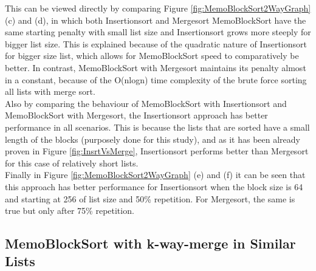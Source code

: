 \documentclass[a4paper,12pt]{article}
\begin{document}
This can be viewed directly by comparing Figure \ref{fig:MemoBlockSort2WayGraph} (c) and (d), in which both Insertionsort and Mergesort MemoBlockSort have the same starting penalty with small list size and Insertionsort grows more steeply for bigger list size. This is explained because of the quadratic nature of Insertionsort for bigger size list, which allows for MemoBlockSort speed to comparatively be better. In contrast, MemoBlockSort with Mergesort maintains its penalty almost in a constant, because of the O(nlogn) time complexity of the brute force sorting all lists with merge sort.\\

Also by comparing the behaviour of MemoBlockSort with Insertionsort and MemoBlockSort with Mergesort, the Insertionsort approach has better performance in all scenarios. This is because the lists that are sorted have a small length of the blocks (purposely done for this study), and as it has been already proven in Figure \ref{fig:InsrtVsMerge}, Insertionsort performs better than Mergesort for this case of relatively short lists.\\


Finally in Figure \ref{fig:MemoBlockSort2WayGraph} (e) and (f)  it can be seen that this approach has better performance for Insertionsort when the block size is 64 and starting at 256 of list size and 50\% repetition. For Mergesort, the same is true but only after 75\% repetition.

\subsection{MemoBlockSort with k-way-merge in Similar Lists}
\end{document}
